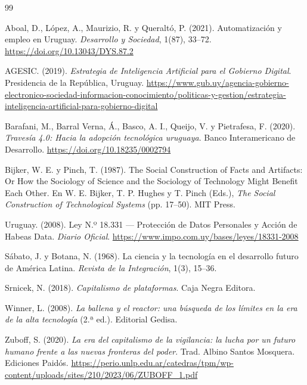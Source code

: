 \documentclass[11pt,a4paper]{article}
\begin{document}
\newpage
\begin{thebibliography}{99}

Aboal, D., López, A., Maurizio, R. y Queraltó, P. (2021). Automatización y empleo en Uruguay. \textit{Desarrollo y Sociedad}, 1(87), 33--72. \url{https://doi.org/10.13043/DYS.87.2}

AGESIC. (2019). \textit{Estrategia de Inteligencia Artificial para el Gobierno Digital}. Presidencia de la República, Uruguay. \url{https://www.gub.uy/agencia-gobierno-electronico-sociedad-informacion-conocimiento/politicas-y-gestion/estrategia-inteligencia-artificial-para-gobierno-digital}

Barafani, M., Barral Verna, Á., Basco, A. I., Queijo, V. y Pietrafesa, F. (2020). \textit{Travesía 4.0: Hacia la adopción tecnológica uruguaya}. Banco Interamericano de Desarrollo. \url{https://doi.org/10.18235/0002794}

Bijker, W. E. y Pinch, T. (1987). The Social Construction of Facts and Artifacts: Or How the Sociology of Science and the Sociology of Technology Might Benefit Each Other. En W. E. Bijker, T. P. Hughes y T. Pinch (Eds.), \textit{The Social Construction of Technological Systems} (pp. 17--50). MIT Press.

Uruguay. (2008). Ley N.º 18.331 --- Protección de Datos Personales y Acción de Habeas Data. \textit{Diario Oficial}. \url{https://www.impo.com.uy/bases/leyes/18331-2008}

Sábato, J. y Botana, N. (1968). La ciencia y la tecnología en el desarrollo futuro de América Latina. \textit{Revista de la Integración}, 1(3), 15--36.

Srnicek, N. (2018). \textit{Capitalismo de plataformas}. Caja Negra Editora.

Winner, L. (2008). \textit{La ballena y el reactor: una búsqueda de los límites en la era de la alta tecnología} (2.ª ed.). Editorial Gedisa.

Zuboff, S. (2020). \textit{La era del capitalismo de la vigilancia: la lucha por un futuro humano frente a las nuevas fronteras del poder}. Trad. Albino Santos Mosquera. Ediciones Paidós. \url{https://perio.unlp.edu.ar/catedras/tpm/wp-content/uploads/sites/210/2023/06/ZUBOFF_1.pdf}

\end{thebibliography}
\end{document}
